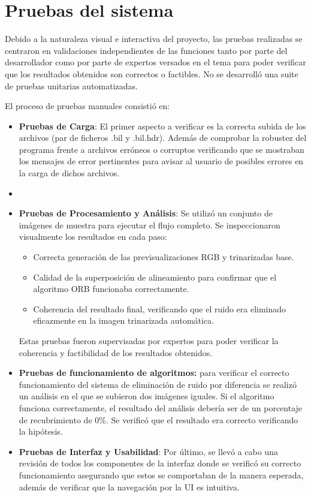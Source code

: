 \section{Pruebas del sistema}
Debido a la naturaleza visual e interactiva del proyecto, las pruebas realizadas se centraron en validaciones independientes de las funciones tanto por parte del desarrollador como por parte de expertos versados en el tema para poder verificar que los resultados obtenidos son correctos o factibles. No se desarrolló una suite de pruebas unitarias automatizadas.

El proceso de pruebas manuales consistió en:
\begin{itemize}
\item \textbf{Pruebas de Carga}: El primer aspecto a verificar es la correcta subida de los archivos (par de ficheros .bil y .bil.hdr). Además de comprobar la robustez del programa frente a archivos erróneos o corruptos verificando que se mostraban los mensajes de error pertinentes para avisar al usuario de posibles errores en la carga de dichos archivos.
\item {}

 \item \textbf{Pruebas de Procesamiento y Análisis}: Se utilizó un conjunto de imágenes de muestra para ejecutar el flujo completo. Se inspeccionaron visualmente los resultados en cada paso:
\begin{itemize}
 \item Correcta generación de las previsualizaciones RGB y trinarizadas base.
 \item Calidad de la superposición de alineamiento para confirmar que el algoritmo ORB funcionaba correctamente.
\item Coherencia del resultado final, verificando que el ruido era eliminado eficazmente en la imagen trinarizada automática.
\end{itemize}
Estas pruebas fueron supervisadas por expertos para poder verificar la coherencia y factibilidad de los resultados obtenidos.

\item \textbf{Pruebas de funcionamiento de algoritmos:} para verificar el correcto funcionamiento del sistema de eliminación de  ruido por diferencia se realizó un análisis en el que se subieron dos imágenes iguales. Si el algoritmo funciona correctamente, el resultado del análisis debería ser de un porcentaje de recubrimiento de 0\%. Se verificó que el resultado era correcto verificando la hipótesis.

\item \textbf{Pruebas de Interfaz y Usabilidad}: Por último, se llevó a cabo una revisión de todos los componentes de la interfaz donde se verificó su correcto funcionamiento asegurando que estos se comportaban de la manera esperada, además de verificar que la navegación por la UI es intuitiva.

\end{itemize}
